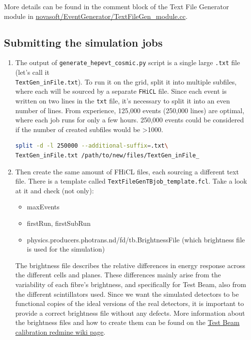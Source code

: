 \documentclass[12pt]{article}
\begin{document}
More details can be found in the comment block of the Text File Generator module in \newline \href{https://github.com/novaexperiment/novasoft/blob/main/EventGenerator/TextFileGen\_module.cc}{novasoft/EventGenerator/TextFileGen\_module.cc}.

\subsection{Submitting the simulation jobs}\label{secGenerator}
\begin{enumerate}
\item The output of \texttt{generate\_hepevt\_cosmic.py} script is a single large \texttt{.txt} file (let's call it \\ \texttt{TextGen\_inFile.txt}). To run it on the grid, split it into multiple subfiles, where each will be sourced by a separate \texttt{FHiCL} file. Since each event is written on two lines in the \texttt{txt} file, it's necessary to split it into an even number of lines. From experience, 125,000 events (250,000 lines) are optimal, where each job runs for only a few hours. 250,000 events could be considered if the number of created subfiles would be >1000.
\begin{lstlisting}[frame=single,language=bash]
split -d -l 250000 --additional-suffix=.txt\
TextGen_inFile.txt /path/to/new/files/TextGen_inFile_
\end{lstlisting}

\item Then create the same amount of FHiCL files, each sourcing a different text file. There is a template called \texttt{TextFileGenTBjob\_template.fcl}. Take a look at it and check (not only):
\begin{itemize}
\item maxEvents
\item firstRun, firstSubRun
\item physics.producers.photrans.nd/fd/tb.BrightnessFile (which brightness file is used for the simulation)
\end{itemize}

The brightness file describes the relative differences in energy response across the different cells and planes. These differences mainly arise from the variability of each fibre's brightness, and specifically for Test Beam, also from the different scintillators used. Since we want the simulated detectors to be functional copies of the ideal versions of the real detectors, it is important to provide a correct brightness file without any defects. More information about the brightness files and how to create them can be found on the \href{https://cdcvs.fnal.gov/redmine/projects/novaart/wiki/Test\_Beam\_Calibration\_Instructions}{Test Beam calibration redmine wiki page}.


\end{enumerate}
\end{document}
